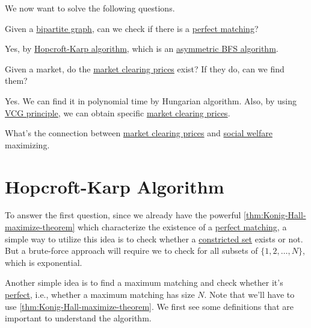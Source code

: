 We now want to solve the following questions.
\begin{problem}
Given a \href{https://en.wikipedia.org/wiki/Bipartite_graph}{bipartite graph}, can we check if there is a \hyperref[def:perfect-matching]{perfect matching}?
\end{problem}
\begin{answer}
	Yes, by \hyperref[sec:Hopcroft-Karp-algorithm]{Hopcroft-Karp algorithm}, which is an \underline{asymmetric \hyperref[algo:BFS]{BFS} algorithm}.
\end{answer}

\begin{problem}
Given a market, do the \hyperref[note:market-clearing-prices]{market clearing prices} exist? If they do, can we find them?
\end{problem}
\begin{answer}
	Yes. We can find it in polynomial time by Hungarian algorithm. Also, by using \hyperref[thm:VCG]{VCG principle}, we can obtain specific \hyperref[note:market-clearing-prices]{market clearing prices}.
\end{answer}

\begin{problem}
What's the connection between \hyperref[note:market-clearing-prices]{market clearing prices} and \hyperref[def:social-welfare]{social welfare} maximizing.
\end{problem}

\section{Hopcroft-Karp Algorithm}\label{sec:Hopcroft-Karp-algorithm}
To answer the first question, since we already have the powerful \autoref{thm:Konig-Hall-maximize-theorem} which characterize the existence of a \hyperref[def:perfect-matching]{perfect matching}, a simple way to utilize this idea is to check whether a \hyperref[def:constricted-set]{constricted set} exists or not. But a brute-force approach will require we to check for all subsets of \(\{1, 2, \dots , N \}\), which is exponential.

Another simple idea is to find a maximum matching and check whether it's \hyperref[def:perfect-matching]{perfect}, i.e., whether a maximum matching has size \(N\). Note that we'll have to use \autoref{thm:Konig-Hall-maximize-theorem}. We first see some definitions that are important to understand the algorithm.

